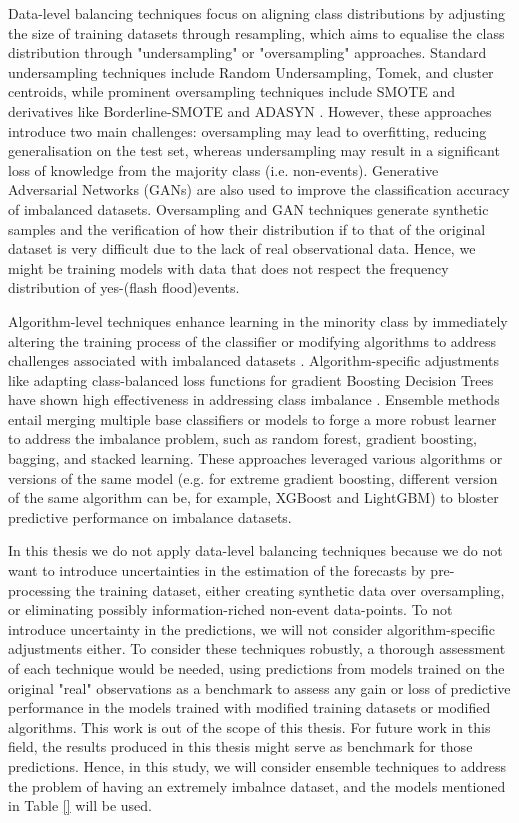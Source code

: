 Data-level balancing techniques focus on aligning class distributions by adjusting the size of training datasets through resampling, which aims to equalise the class distribution through "undersampling" or "oversampling" approaches. Standard undersampling techniques include Random Undersampling, Tomek, and cluster centroids, while prominent oversampling techniques include SMOTE and derivatives like Borderline-SMOTE and ADASYN \citep{DeVargas_2023}. However, these approaches introduce two main challenges: oversampling may lead to overfitting, reducing generalisation on the test set, whereas undersampling may result in a significant loss of knowledge from the majority class (i.e. non-events). Generative Adversarial Networks (GANs) are also used to improve the classification accuracy of imbalanced datasets. Oversampling and GAN techniques generate synthetic samples and the verification of how their distribution if to that of the original dataset is very difficult due to the lack of real observational data. Hence, we might be training models with data that does not respect the frequency distribution of yes-(flash flood)events.

Algorithm-level techniques enhance learning in the minority class by immediately altering the training process of the classifier or modifying algorithms to address challenges associated with imbalanced datasets \citep{Altalhan_2025}. Algorithm-specific adjustments like adapting class-balanced loss functions for gradient Boosting Decision Trees have shown high effectiveness in addressing class imbalance \citep{Luo_2025}. Ensemble methods entail merging multiple base classifiers or models to forge a more robust learner to address the imbalance problem, such as random forest, gradient boosting, bagging, and stacked learning. These approaches leveraged various algorithms or versions of the same model (e.g. for extreme gradient boosting, different version of the same algorithm can be, for example, XGBoost and LightGBM) to bloster predictive performance on imbalance datasets. 

In this thesis we do not apply data-level balancing techniques because we do not want to introduce uncertainties in the estimation of the forecasts by pre-processing the training dataset, either creating synthetic data over oversampling, or eliminating possibly information-riched non-event data-points. To not introduce uncertainty in the predictions, we will not consider algorithm-specific adjustments either. To consider these techniques robustly, a thorough assessment of each technique would be needed, using predictions from models trained on the original "real" observations as a benchmark to assess any gain or loss of predictive performance in the models trained with modified training datasets or modified algorithms. This work is out of the scope of this thesis. For future work in this field, the results produced in this thesis might serve as benchmark for those predictions. Hence, in this study, we will consider ensemble techniques to address the problem of having an extremely imbalnce dataset, and the models mentioned in Table \ref{} will be used. 


